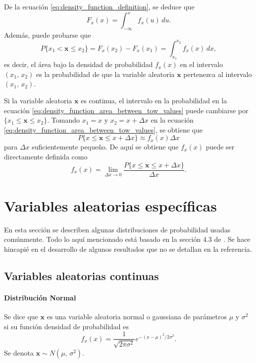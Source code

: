 \documentclass[a4paper]{report}
\newcommand{\x}{\mathbf{x}}
\begin{document}
De la ecuación \ref{eq:density_function_definition}, se deduce que
\[
 F_x(x)=\int_{-\infty}^{x}f_x(u)\,du.
\]
Además, puede probarse que
\begin{equation}\label{eq:density_function_area_between_tow_values}
 P\{x_1<\x\leq x_2\}=F_x(x_2)-F_x(x_1)=\int_{x_1}^{x_2}f_x(x)\,dx,
\end{equation}
es decir, el área bajo la densidad de probabilidad \(f_x(x)\) en el intervalo \((x_1,\,x_2)\) es la probabilidad de que la variable aleatoria \(\x\) pertenezca al intervalo \((x_1,\,x_2)\). 

Si la variable aleatoria \(\x\) es continua, el intervalo en la probabilidad en la ecuación \ref{eq:density_function_area_between_tow_values} puede cambiarse por \(\{x_1\leq\x\leq x_2\}\). Tomando \(x_1=x\) y \(x_2=x+\Delta x\) en la ecuación \ref{eq:density_function_area_between_tow_values}, se obtiene que
\begin{equation}\label{eq:density_definition_as_probability}
 P\{x\leq\x\leq x+\Delta x\}\approx f_x(x)\Delta x
\end{equation}
para \(\Delta x\) suficientemente pequeño. De aquí se obtiene que \(f_x(x)\) puede ser directamente definida como
\begin{equation}\label{eq:density_function_definition_2}
 f_x(x)=\lim_{\Delta x\to0}\frac{P\{x\leq\x\leq x+\Delta x\}}{\Delta x}.
\end{equation}

\section{Variables aleatorias específicas}

En esta sección se describen algunas distribuciones de probabilidad usadas comúnmente. Todo lo aquí mencionado está basado en la sección 4.3 de \cite{papoulis2002probability}. Se hace hincapié en el desarrollo de algunos resultados que no se detallan en la referencia.

\subsection{Variables aleatorias continuas}\label{sec:continuous_random_variables}

\paragraph{Distribución Normal}

Se dice que \(\x\) es una variable aleatoria normal o gaussiana de parámetros \(\mu\) y \(\sigma^2\) si su función densidad de probabilidad es
\begin{equation}\label{eq:pdf_gaussian}
 f_x(x)=\frac{1}{\sqrt{2\pi\sigma^2}}e^{-(x-\mu)^2/2\sigma^2}.
\end{equation}
Se denota \(\x\sim N(\mu,\,\sigma^2)\). 
\end{document}
